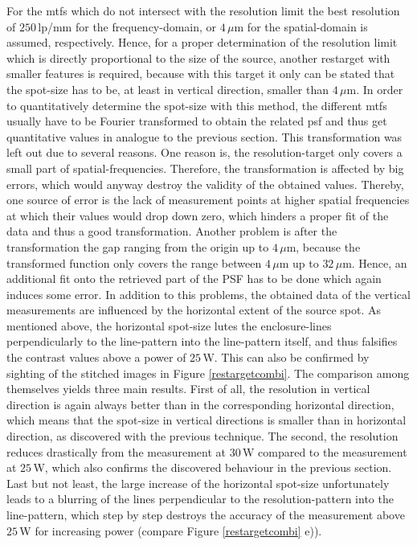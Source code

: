 For the \glspl{mtf} which do not intersect with the resolution limit the best resolution of $250\,$lp/mm for the frequency-domain, or $4\, \mu$m for the spatial-domain is assumed, respectively. Hence, for a proper determination of the resolution limit which is directly proportional to the size of the source, another \gls{restarget} with smaller features is required, because with this target it only can be stated that the spot-size has to be, at least in vertical direction, smaller than $4\,\mu$m. In order to quantitatively determine the spot-size with this method, the different \glspl{mtf} usually have to be Fourier transformed to obtain the related \gls{psf} and thus get quantitative values in analogue to the previous section. This transformation was left out due to several reasons. One reason is, the resolution-target only covers a small part of spatial-frequencies. Therefore, the transformation is affected by big errors, which would anyway destroy the validity of the obtained values. Thereby, one source of error is the lack of measurement points at higher spatial frequencies at which their values would drop down zero, which hinders a proper fit of the data and thus a good transformation. Another problem is after the transformation the gap ranging from the origin up to $4\, \mu$m, because the transformed function only covers the range between $4\, \mu$m up to $32\, \mu$m. Hence, an additional fit onto the retrieved part of the PSF has to be done which again induces some error. In addition to this problems, the obtained data of the vertical measurements are influenced by the horizontal extent of the source spot. As mentioned above, the horizontal spot-size lutes the enclosure-lines perpendicularly to the line-pattern into the line-pattern itself, and thus falsifies the contrast values above a power of $25\,$W. This can also be confirmed by sighting of the stitched images in Figure \ref{restargetcombi}. The comparison among themselves yields three main results. First of all, the resolution in vertical direction is again always better than in the corresponding horizontal direction, which means that the spot-size in vertical directions is smaller than in horizontal direction, as discovered with the previous technique. The second, the resolution reduces drastically from the measurement at $30\,$W compared to the measurement at $25\,$W, which also confirms the discovered behaviour in the previous section. Last but not least, the large increase of the horizontal spot-size unfortunately leads to a blurring of the lines perpendicular to the resolution-pattern into the line-pattern, which step by step destroys the accuracy of the measurement above $25\,$W for increasing power (compare Figure \ref{restargetcombi} e)).  

